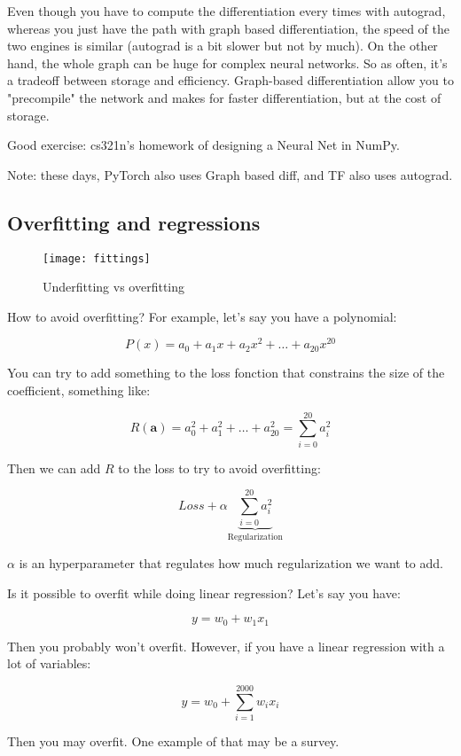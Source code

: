 \documentclass{article}
\theoremstyle{problemstyle}
\begin{document}
Even though you have to compute the differentiation every times with autograd, whereas you just have the path with graph based differentiation, the speed of the two engines is similar (autograd is a bit slower but not by much). On the other hand, the whole graph can be huge for complex neural networks. So as often, it's a tradeoff between storage and efficiency. Graph-based differentiation allow you to "precompile" the network and makes for faster differentiation, but at the cost of storage. 

Good exercise: cs321n's homework of designing a Neural Net in NumPy. 

Note: these days, PyTorch also uses Graph based diff, and TF also uses autograd.


\subsection{Overfitting and regressions}

\begin{figure}[h]
  \texttt{[image: fittings]}
  \caption{Underfitting vs overfitting}
\end{figure}

How to avoid overfitting? For example, let's say you have a polynomial:

\[
  P(x) = a_0 + a_1x + a_2 x^2+ \dots + a_{20}x^{20}
\]

You can try to add something to the loss fonction that constrains the size of the coefficient, something like:

\[
  R(\textbf{a}) = a_0^2 + a_1^2 + \dots + a_{20} ^2 = \sum\limits_{i=0}^{20} a_i ^ 2
\]

Then we can add $R$ to the loss to try to avoid overfitting:

\[
  Loss + \alpha \underbrace{\sum\limits_{i=0}^{20} a_i ^ 2}_{\text{Regularization} }
\]

$\alpha$ is an hyperparameter that regulates how much regularization we want to add.

Is it possible to overfit while doing linear regression? Let's say you have:

\[
  y = w_0 + w_1 x_1
\]

Then you probably won't overfit. However, if you have a linear regression with a lot of variables:

\[
  y = w_0 + \sum\limits_{i=1}^{2000} w_i x_i
\]

Then you may overfit. One example of that may be a survey. 
\end{document}
